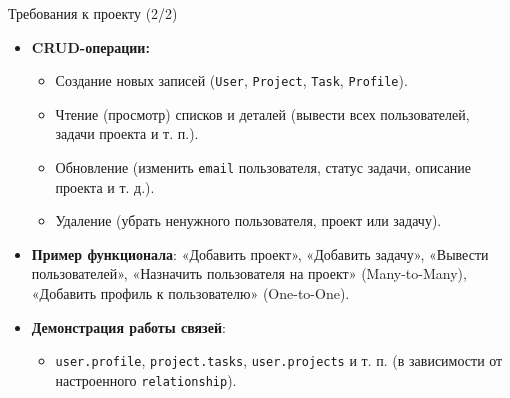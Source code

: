 \documentclass{beamer}
\begin{document}
\begin{frame}{Требования к проекту (2/2)}
	\begin{itemize}
		\item \textbf{CRUD-операции:}
		      \begin{itemize}
			      \item Создание новых записей (\texttt{User}, \texttt{Project}, \texttt{Task}, \texttt{Profile}).
			      \item Чтение (просмотр) списков и деталей (вывести всех пользователей, задачи проекта и т. п.).
			      \item Обновление (изменить \texttt{email} пользователя, статус задачи, описание проекта и т. д.).
			      \item Удаление (убрать ненужного пользователя, проект или задачу).
		      \end{itemize}
		\item \textbf{Пример функционала}: «Добавить проект», «Добавить задачу», «Вывести пользователей»,
		      «Назначить пользователя на проект» (Many-to-Many), «Добавить профиль к пользователю» (One-to-One).
		\item \textbf{Демонстрация работы связей}:
		      \begin{itemize}
			      \item \texttt{user.profile}, \texttt{project.tasks}, \texttt{user.projects}
			            и т. п. (в зависимости от настроенного \texttt{relationship}).
		      \end{itemize}
	\end{itemize}
\end{frame}
\end{document}
